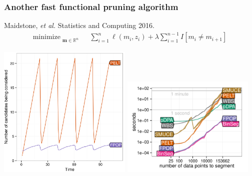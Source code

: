 \documentclass{beamer}
\DeclareMathOperator*{\minimize}{minimize}
\newcommand{\RR}{\mathbb R}
\begin{document}
\begin{frame}
  \frametitle{Another fast functional pruning algorithm}
  Maidstone, {\it et al.} Statistics and Computing 2016.
\vskip -0.5cm
\begin{align*}
    \minimize_{\substack{
  \mathbf m\in\RR^{n}
  }} &\ \ 
    \sum_{i=1}^n \ell( m_i,  z_i)  + \lambda{\sum_{i=1}^{n-1}I[m_{i}\neq m_{i+1}]}
  \nonumber 
\end{align*}

\centering
  \includegraphics[width=0.48\textwidth]{screenshot-Maidstone-figure-4}
\includegraphics[width=0.48\textwidth]{figure-systemtime-arrays-bins}
  
\end{frame}
\end{document}
